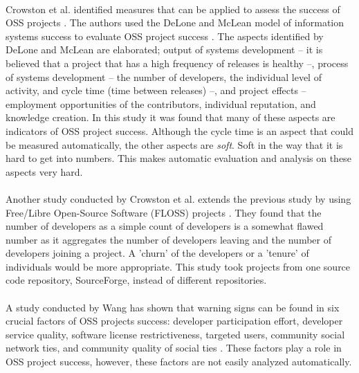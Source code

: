 \paragraph{}
Crowston et al. identified measures that can be applied to assess the success of
OSS projects \cite{crowston2003}. The authors used the DeLone and McLean model
of information systems success to evaluate OSS project success
\cite{delone1992}. The aspects identified by DeLone and McLean are elaborated;
output of systems development -- it is believed that a project that has a high
frequency of releases is healthy --, process of systems development -- the
number of developers, the individual level of activity, and cycle time (time
between releases) --, and project effects -- employment opportunities of the
contributors, individual reputation, and knowledge creation. In this study it
was found that many of these aspects are indicators of OSS project success.
Although the cycle time is an aspect that could be measured automatically, the
other aspects are \emph{soft}\rm. Soft in the way that it is hard to get into
numbers. This makes automatic evaluation and analysis on these aspects very
hard.

\paragraph{}
Another study conducted by Crowston et al. extends the previous study by using
Free/Libre Open-Source Software (FLOSS) projects \cite{crowston2006}. They found
that the number of developers as a simple count of developers is a somewhat
flawed number as it aggregates the number of developers leaving and the number
of developers joining a project. A 'churn' of the developers or a 'tenure' of
individuals would be more appropriate.
This study took projects from one source code repository, SourceForge, instead
of different repositories.

\paragraph{}
A study conducted by Wang has shown that warning signs can be found in
six crucial factors of OSS projects success: developer participation effort,
developer service quality, software license restrictiveness, targeted users,
community social network ties, and community quality of social ties
\cite{wang2012}.
These factors play a role in OSS project success, however, these factors are not
easily analyzed automatically.

